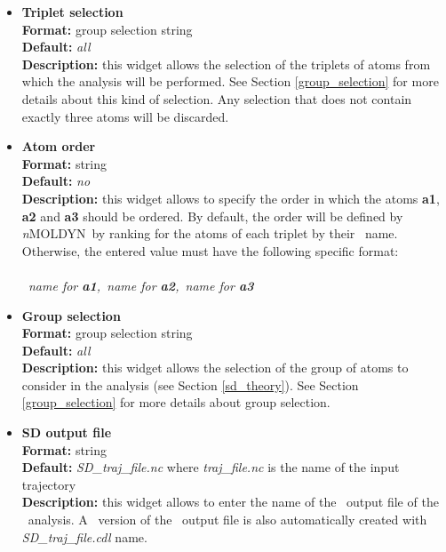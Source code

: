 \documentclass[a4paper,11pt]{report}
\newcommand{\NMOLDYN}{\textit{n}MOLDYN}
\begin{document}
\begin{itemize}
\item \textbf{Triplet selection}\\
\textbf{Format:} group selection string\\
\textbf{Default:} \textit{all}\\
\textbf{Description:} this widget allows the selection of the triplets of atoms from which the analysis will be 
performed. See Section \ref{group_selection} for more details about this kind of selection. Any selection that does not 
contain exactly three atoms will be discarded.

\item \textbf{Atom order}\\
\textbf{Format:} string\\
\textbf{Default:} \textit{no}\\
\textbf{Description:} this widget allows to specify the order in which the atoms \textbf{a1}, \textbf{a2} and \textbf{a3} should be 
ordered. By default, the order will be defined by \NMOLDYN\ by ranking for the atoms of each triplet by their
\MMTK\ name. Otherwise, the entered value must have the following specific format:
\\\\
\textit{\MMTK\ name for \textbf{a1},\MMTK\ name for \textbf{a2},\MMTK\ name for \textbf{a3}}

\item \textbf{Group selection}\\
\textbf{Format:} group selection string\\
\textbf{Default:} \textit{all}\\
\textbf{Description:} this widget allows the selection of the group of atoms to consider in the analysis 
(see Section \ref{sd_theory}). See Section \ref{group_selection} for more details about group selection.

\item \textbf{SD output file}\\
\textbf{Format:} string\\
\textbf{Default:} \textit{SD\_traj\_file.nc} where \textit{traj\_file.nc} is the name of the input trajectory\\
\textbf{Description:} this widget allows to enter the name of the \NetCDF\ output file of the \SD\ analysis. A \CDL\ 
version of the \NetCDF\ output file is also automatically created with \textit{SD\_traj\_file.cdl} name.
\end{itemize}
\end{document}
